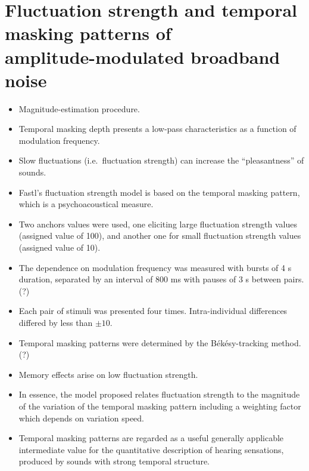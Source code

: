 \section{Fluctuation strength and temporal masking patterns of
\texorpdfstring{\\}{} amplitude-modulated broadband noise}

\begin{itemize}
    \item Magnitude-estimation procedure.
    \item Temporal masking depth presents a low-pass characteristics as a
        function of modulation frequency.
    \item Slow fluctuations (i.e.\ fluctuation strength) can increase the
        ``pleasantness'' of sounds.
    \item Fastl's fluctuation strength model is based on the temporal masking
        pattern, which is a psychoacoustical measure.
    \item  Two anchors values were used, one eliciting large fluctuation
        strength values (assigned value of 100), and another one for small
        fluctuation strength values (assigned value of 10).
    \item The dependence on modulation frequency was measured with bursts of 4 s
        duration, separated by an interval of 800 ms with pauses of 3 s between
        pairs. (?)
    \item Each pair of stimuli was presented four times. Intra-individual
        differences differed by less than $\pm 10$.
    \item Temporal masking patterns were determined by the Békésy-tracking
        method. (?)
    \item Memory effects arise on low fluctuation strength.
    \item In essence, the model proposed relates fluctuation strength to the
        magnitude of the variation of the temporal masking pattern including a
        weighting factor which depends on variation speed.
    \item Temporal masking patterns are regarded as a useful generally
        applicable intermediate value for the quantitative description of
        hearing sensations, produced by sounds with strong temporal structure.

\end{itemize}
